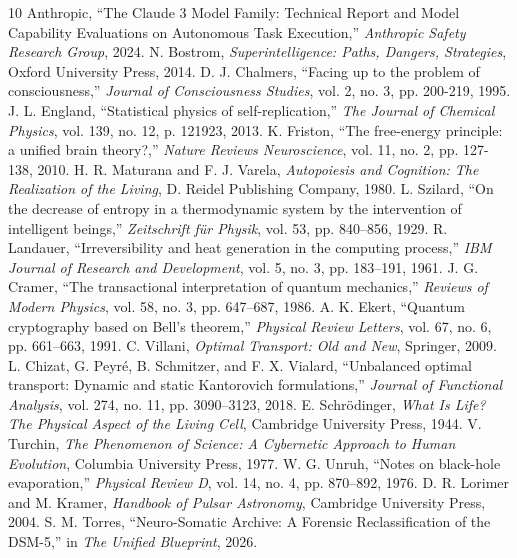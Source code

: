 \documentclass[twocolumn, 10pt, journal, letterpaper]{IEEEtran}
\begin{document}
\begin{thebibliography}{10}
 Anthropic, ``The Claude 3 Model Family: Technical Report and Model Capability Evaluations on Autonomous Task Execution,'' \textit{Anthropic Safety Research Group}, 2024.
 N. Bostrom, \textit{Superintelligence: Paths, Dangers, Strategies}, Oxford University Press, 2014.
 D. J. Chalmers, ``Facing up to the problem of consciousness,'' \textit{Journal of Consciousness Studies}, vol. 2, no. 3, pp. 200-219, 1995.
 J. L. England, ``Statistical physics of self-replication,'' \textit{The Journal of Chemical Physics}, vol. 139, no. 12, p. 121923, 2013.
 K. Friston, ``The free-energy principle: a unified brain theory?,'' \textit{Nature Reviews Neuroscience}, vol. 11, no. 2, pp. 127-138, 2010.
 H. R. Maturana and F. J. Varela, \textit{Autopoiesis and Cognition: The Realization of the Living}, D. Reidel Publishing Company, 1980.
 L. Szilard, ``On the decrease of entropy in a thermodynamic system by the intervention of intelligent beings,'' \textit{Zeitschrift f\"ur Physik}, vol. 53, pp. 840--856, 1929.
 R. Landauer, ``Irreversibility and heat generation in the computing process,'' \textit{IBM Journal of Research and Development}, vol. 5, no. 3, pp. 183--191, 1961.
 J. G. Cramer, ``The transactional interpretation of quantum mechanics,'' \textit{Reviews of Modern Physics}, vol. 58, no. 3, pp. 647--687, 1986.
 A. K. Ekert, ``Quantum cryptography based on Bell's theorem,'' \textit{Physical Review Letters}, vol. 67, no. 6, pp. 661--663, 1991.
 C. Villani, \textit{Optimal Transport: Old and New}, Springer, 2009.
 L. Chizat, G. Peyré, B. Schmitzer, and F. X. Vialard, ``Unbalanced optimal transport: Dynamic and static Kantorovich formulations,'' \textit{Journal of Functional Analysis}, vol. 274, no. 11, pp. 3090--3123, 2018.
 E. Schr\"odinger, \textit{What Is Life? The Physical Aspect of the Living Cell}, Cambridge University Press, 1944.
 V. Turchin, \textit{The Phenomenon of Science: A Cybernetic Approach to Human Evolution}, Columbia University Press, 1977.
 W. G. Unruh, ``Notes on black-hole evaporation,'' \textit{Physical Review D}, vol. 14, no. 4, pp. 870--892, 1976.
 D. R. Lorimer and M. Kramer, \textit{Handbook of Pulsar Astronomy}, Cambridge University Press, 2004.
 S. M. Torres, ``Neuro-Somatic Archive: A Forensic Reclassification of the DSM-5,'' in \textit{The Unified Blueprint}, 2026.
\end{thebibliography}
\end{document}
